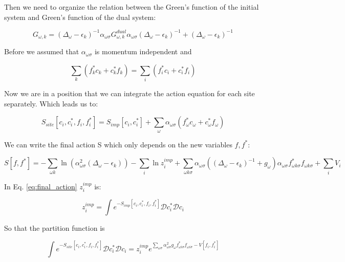 Then we need to organize the relation between the Green's function of the initial system and Green's function of the dual system:

\begin{equation}
    G_{\omega , k}= (\Delta _\omega - \epsilon _k)^{-1} \alpha_{\omega \sigma} G_{\omega , k} ^{dual} \alpha_{\omega \sigma} (\Delta _\omega - \epsilon _k)^{-1} + (\Delta _\omega - \epsilon _k)^{-1}
\end{equation}

Before we assumed that $\alpha_{\omega \sigma}$ is momentum independent and 

\begin{equation}
    \sum _{k}(f_k ^*c_k+c_k ^* f_k)=\sum _{i}(f_i ^*c_i+c_i ^* f_i)
\end{equation}

Now we are in a position that we can integrate the action equation for each site separately. Which leads us to:

\begin{equation}
    S_{site}[c_i, c_i ^*, f_i, f_i ^*]= S_{imp} [c_i, c_i ^*] +\sum _\omega \alpha_{\omega \sigma} (f_\omega ^*c_\omega +c_\omega ^* f_\omega)
\end{equation}

We can write the final action S which only depends on the new variables $f, f^*$:

\begin{equation}
    S[f, f^*]= -\sum _{\omega k} \ln(\alpha _{\omega \sigma} ^2 (\Delta _\omega - \epsilon _k)) - \sum _i \ln z_i ^{imp} + \sum _{\omega k \sigma} \alpha _{\omega \sigma} ((\Delta _\omega - \epsilon _k)^{-1} +g_\omega) \alpha _{\omega \sigma} f_{\omega k \sigma} ^ *f_{\omega k \sigma} +\sum _i V_i
    \label{eq:final_action}
\end{equation}

In Eq. \ref{eq:final_action} $z_i ^{imp}$ is:

\begin{equation}
    z_i ^{imp}= \int e ^{-S_{imp}[c_i, c_i ^*, f_i, f_i ^*]} \mathcal{D}c_i ^* \mathcal{D}c_i
\end{equation}

\noindent So that the partition function is

\begin{equation}
    \int e^{-S_{site}[c_i, c_i ^*, f_i, f_i ^*]} \mathcal{D} c_i ^* \mathcal{D}c_i = z_i ^{imp} e^{\sum _{\omega \sigma} \alpha _{\omega \sigma} ^2 g_\omega f_{\omega i \sigma}^* f_{\omega i \sigma} -V[f_i, f_i ^*]}
\end{equation}

